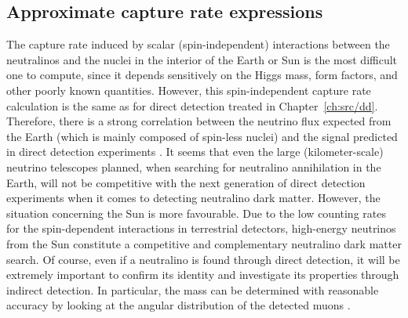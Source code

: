 \subsection{Approximate capture rate expressions}

The capture rate induced by scalar (spin-independent) interactions
between the neutralinos and the nuclei in the interior of the Earth or
Sun is the most difficult one to compute, since it depends sensitively
on the Higgs mass, form factors, and other poorly known quantities.
However, this spin-independent capture rate calculation is the same as
for direct detection treated in Chapter~\ref{ch:src/dd}.  Therefore,
there is a strong correlation between the neutrino flux expected from
the Earth (which is mainly composed of spin-less nuclei) and the
signal predicted in direct detection experiments \cite{Bergstrom:1998xh,Kamionkowski:1994dp}.
It seems that even the large (kilometer-scale) neutrino telescopes
planned, when searching for neutralino annihilation in the Earth, will
not be competitive with the next generation of direct detection
experiments when it comes to detecting neutralino dark matter.
However, the situation concerning the Sun is more favourable.  Due to
the low counting rates for the spin-dependent interactions in
terrestrial detectors, high-energy neutrinos from the Sun constitute a
competitive and complementary neutralino dark matter search.  Of
course, even if a neutralino is found through direct detection, it
will be extremely important to confirm its identity and investigate
its properties through indirect detection.  In particular, the mass
can be determined with reasonable accuracy by looking at the angular
distribution of the detected muons \cite{Edsjo:1995zc,Bergstrom:1997tp}.


